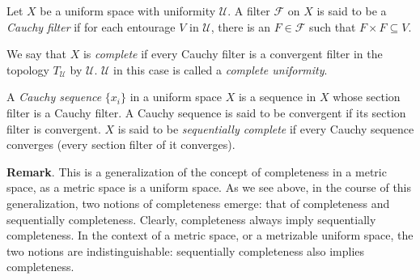 \documentclass[12pt]{article}
\begin{document}

Let $X$ be a uniform space with uniformity $\mathcal{U}$.  A filter $\mathcal{F}$ on $X$ is said to be a \emph{Cauchy filter} if for each entourage $V$ in $\mathcal{U}$, there is an $F\in \mathcal{F}$ such that $F\times F\subseteq V$.  

We say that $X$ is \emph{complete} if every Cauchy filter is a convergent filter in the topology $T_{\mathcal{U}}$  by $\mathcal{U}$.  $\mathcal{U}$ in this case is called a \emph{complete uniformity}.

A \emph{Cauchy sequence} $\lbrace x_i\rbrace$ in a uniform space $X$ is a sequence in $X$ whose section filter is a Cauchy filter.  A Cauchy sequence is said to be convergent if its section filter is convergent.  $X$ is said to be \emph{sequentially complete} if every Cauchy sequence converges (every section filter of it converges).

\textbf{Remark}.  This is a generalization of the concept of completeness in a metric space, as a metric space is a uniform space.  As we see above, in the course of this generalization, two notions of completeness emerge: that of completeness and sequentially completeness.  Clearly, completeness always imply sequentially completeness.  In the context of a metric space, or a metrizable uniform space, the two notions are indistinguishable: sequentially completeness also implies completeness.
\end{document}
